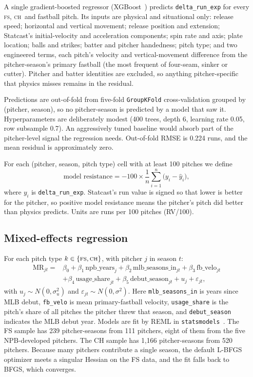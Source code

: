\documentclass[11pt]{article}
\newcommand{\code}[1]{\texttt{#1}}
\newcommand{\FS}{\textsc{fs}}
\newcommand{\CH}{\textsc{ch}}
\begin{document}
A single gradient-boosted regressor (XGBoost~\cite{xgboost}) predicts \code{delta\_run\_exp} for every \FS, \CH\ and fastball pitch. Its inputs are physical and situational only: release speed; horizontal and vertical movement; release position and extension; Statcast's initial-velocity and acceleration components; spin rate and axis; plate location; balls and strikes; batter and pitcher handedness; pitch type; and two engineered terms, each pitch's velocity and vertical-movement difference from the pitcher-season's primary fastball (the most frequent of four-seam, sinker or cutter). Pitcher and batter identities are excluded, so anything pitcher-specific that physics misses remains in the residual.

Predictions are out-of-fold from five-fold \code{GroupKFold} cross-validation grouped by (pitcher, season), so no pitcher-season is predicted by a model that saw it. Hyperparameters are deliberately modest (400 trees, depth 6, learning rate 0.05, row subsample 0.7). An aggressively tuned baseline would absorb part of the pitcher-level signal the regression needs. Out-of-fold RMSE is 0.224 runs, and the mean residual is approximately zero.

For each (pitcher, season, pitch type) cell with at least 100 pitches we define
\begin{equation}
\text{model resistance} = -100 \times \frac{1}{n}\sum_{i=1}^{n}\bigl(y_i - \hat y_i\bigr),
\end{equation}
where $y_i$ is \code{delta\_run\_exp}. Statcast's run value is signed so that lower is better for the pitcher, so positive model resistance means the pitcher's pitch did better than physics predicts. Units are runs per 100 pitches (RV/100).

\subsection{Mixed-effects regression}

For each pitch type $k \in \{\FS, \CH\}$, with pitcher $j$ in season $t$:
\begin{equation}
\begin{aligned}
\text{MR}_{jt} = {} & \beta_0 + \beta_1\,\text{npb\_years}_j + \beta_2\,\text{mlb\_seasons\_in}_{jt} + \beta_3\,\text{fb\_velo}_{jt} \\
& + \beta_4\,\text{usage\_share}_{jt} + \beta_5\,\text{debut\_season}_{jt} + u_j + \varepsilon_{jt},
\end{aligned}
\end{equation}
with $u_j \sim N(0, \sigma_u^2)$ and $\varepsilon_{jt} \sim N(0, \sigma^2)$. Here \code{mlb\_seasons\_in} is years since MLB debut, \code{fb\_velo} is mean primary-fastball velocity, \code{usage\_share} is the pitch's share of all pitches the pitcher threw that season, and \code{debut\_season} indicates the MLB debut year. Models are fit by REML in \code{statsmodels}~\cite{statsmodels}. The FS sample has 239 pitcher-seasons from 111 pitchers, eight of them from the five NPB-developed pitchers. The CH sample has 1,166 pitcher-seasons from 520 pitchers. Because many pitchers contribute a single season, the default L-BFGS optimizer meets a singular Hessian on the FS data, and the fit falls back to BFGS, which converges.
\end{document}

